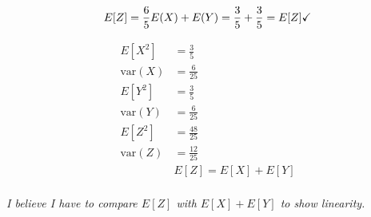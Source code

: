\documentclass[12pt, a4paper]{article}
\begin{document}
$$
E[Z] = \frac{6}{5} \\
E(X) + E(Y) = \frac{3}{5} + \frac{3}{5}  = E[Z] \checkmark \\
$$

\begin{align*}
E[X^2] &= \frac{3}{5} \\
\text{var}(X) &= \frac{6}{25} \\
E[Y^2] &= \frac{3}{5} \\
\text{var}(Y) &= \frac{6}{25} \\
E[Z^2] &= \frac{48}{25} \\
\text{var}(Z) &= \frac{12}{25} \\
&\boxed{E[Z] = E[X] + E[Y]} \\
\end{align*}

\textit{I believe I have to compare $E[Z]$ with $E[X]+E[Y]$ to show linearity.}

\end{document}

